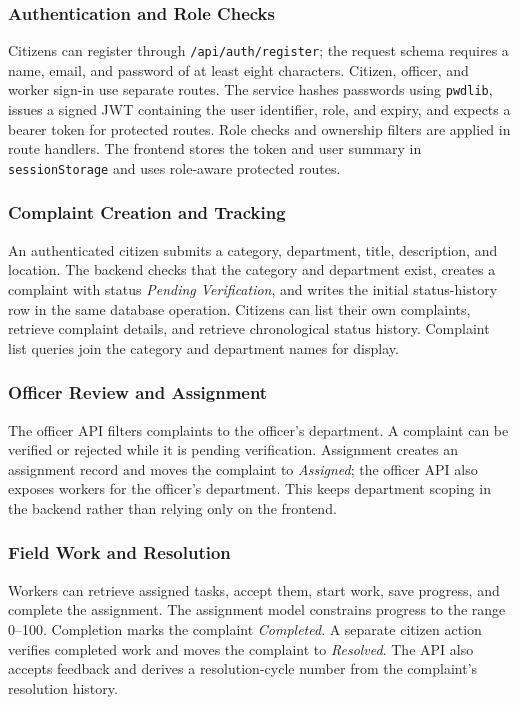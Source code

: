 \documentclass[12pt,a4paper]{report}
\begin{document}
\subsubsection{Authentication and Role Checks}

Citizens can register through \texttt{/api/auth/register}; the request schema requires a name, email, and password of at least eight characters. Citizen, officer, and worker sign-in use separate routes. The service hashes passwords using \texttt{pwdlib}, issues a signed JWT containing the user identifier, role, and expiry, and expects a bearer token for protected routes. Role checks and ownership filters are applied in route handlers. The frontend stores the token and user summary in \texttt{sessionStorage} and uses role-aware protected routes.

\subsubsection{Complaint Creation and Tracking}

An authenticated citizen submits a category, department, title, description, and location. The backend checks that the category and department exist, creates a complaint with status \emph{Pending Verification}, and writes the initial status-history row in the same database operation. Citizens can list their own complaints, retrieve complaint details, and retrieve chronological status history. Complaint list queries join the category and department names for display.

\subsubsection{Officer Review and Assignment}

The officer API filters complaints to the officer's department. A complaint can be verified or rejected while it is pending verification. Assignment creates an assignment record and moves the complaint to \emph{Assigned}; the officer API also exposes workers for the officer's department. This keeps department scoping in the backend rather than relying only on the frontend.

\subsubsection{Field Work and Resolution}

Workers can retrieve assigned tasks, accept them, start work, save progress, and complete the assignment. The assignment model constrains progress to the range 0--100. Completion marks the complaint \emph{Completed}. A separate citizen action verifies completed work and moves the complaint to \emph{Resolved}. The API also accepts feedback and derives a resolution-cycle number from the complaint's resolution history.
\end{document}
